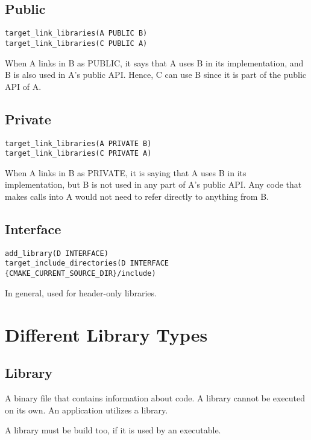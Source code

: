 \subsection{Public}

\begin{verbatim}
target_link_libraries(A PUBLIC B)
target_link_libraries(C PUBLIC A)
\end{verbatim}

When A links in B as PUBLIC, it says that A uses B in its implementation, and B is also used in A's public API. Hence, C can use B since it is part of the public API of A.

\subsection{Private}

\begin{verbatim}
target_link_libraries(A PRIVATE B)
target_link_libraries(C PRIVATE A)
\end{verbatim}


When A links in B as PRIVATE, it is saying that A uses B in its
implementation, but B is not used in any part of A's public API. Any code
that makes calls into A would not need to refer directly to anything from
B.

\subsection{Interface}

\begin{verbatim}
add_library(D INTERFACE)
target_include_directories(D INTERFACE {CMAKE_CURRENT_SOURCE_DIR}/include)
\end{verbatim}

In general, used for header-only libraries.

\section{Different Library Types}

\subsection{Library}

A binary file that contains information about code.
A library cannot be executed on its own.
An application utilizes a library.

A library must be build too, if it is used by an executable.

